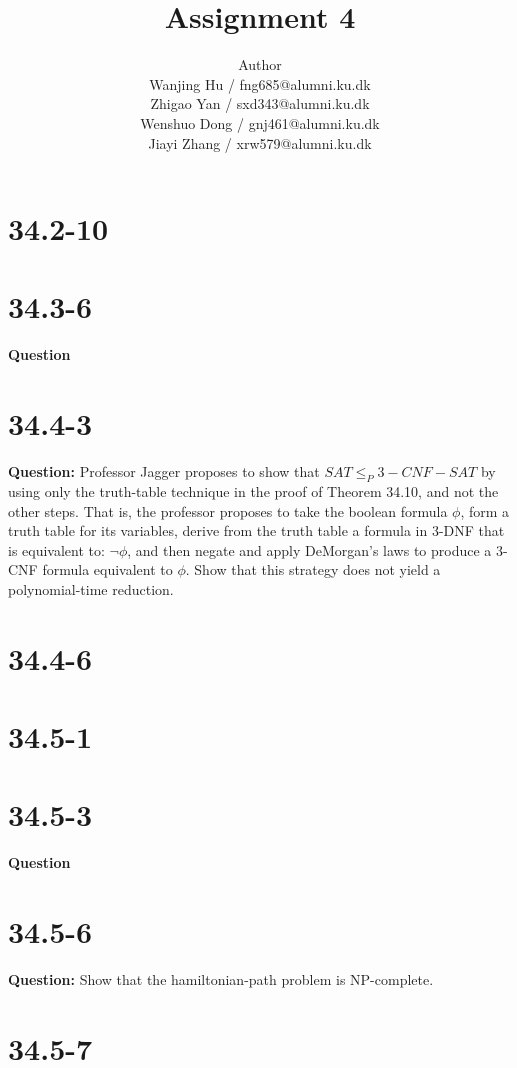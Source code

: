 \documentclass[12pt]{article}
\title{Assignment 4}
\author{Author \\
  Wanjing Hu / fng685@alumni.ku.dk  \\
  Zhigao Yan / sxd343@alumni.ku.dk  \\
  Wenshuo Dong / gnj461@alumni.ku.dk  \\
  Jiayi Zhang / xrw579@alumni.ku.dk \\
}
\begin{document}
\maketitle

\section{34.2-10}

\section{34.3-6}
\textbf{Question}

\section{34.4-3}
\textbf{Question: }Professor Jagger proposes to show that \(SAT \leq_P 3-CNF-SAT \) by using only the truth-table technique in the proof of Theorem 34.10, and not the other steps. That is, the professor proposes to take the boolean formula \(\phi\), form a truth table for its variables, derive from the truth table a formula in 3-DNF that is equivalent
to: \(\lnot\phi\), and then negate and apply DeMorgan’s laws to produce a 3-CNF formula
equivalent to \(\phi\). Show that this strategy does not yield a polynomial-time reduction.

\section{34.4-6}

\section{34.5-1}

\section{34.5-3}
\textbf{Question}

\section{34.5-6}
\textbf{Question: }Show that the hamiltonian-path problem is NP-complete.

\section{34.5-7}
\end{document}
